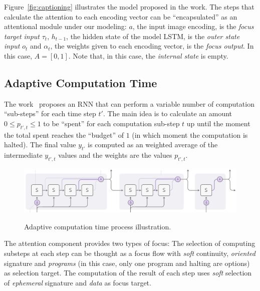 \documentclass[11pt]{article}
\begin{document}
Figure~\ref{fig:captioning} illustrates the model proposed in the work.
The steps that calculate the attention to each encoding vector can be ``encapsulated'' as
an attentional module under our modeling:
$a$, the input image encoding, is the \emph{focus target input} $\tau_t$,
$h_{t-1}$, the hidden state of the model LSTM, is the \emph{outer state input} $o_t$
and $\alpha_t$, the weights given to each encoding vector, is the \emph{focus output}. In this case, $A = [0, 1]$.
Note that, in this case, the \emph{internal state} is empty.

\subsection{Adaptive Computation Time}
The work~\cite{ref:act} proposes an RNN that can perform a variable number of computation ``sub-steps'' for each time step $t'$.
The main idea is to calculate an amount $0 \le p_{t',t} \le 1$ to be ``spent'' for each computation sub-step $t$ up until the
moment the total spent reaches the ``budget'' of $1$ (in which moment the computation is halted).
The final value $y_{t'}$ is computed as an weighted average of the intermediate $y_{t',t}$ values and the weights are the values
$p_{t',t}$.

\begin{figure}[H]
    \centering
    \includegraphics[width=0.8\linewidth]{./img/adaptive_comp.png}\label{fig:adct}
    \caption{Adaptive computation time process illustration.}
\end{figure}

The attention component provides two types of focus:
The selection of computing substeps at each step can be thought as a focus flow with \emph{soft} continuity,
\emph{oriented} signature and \emph{programs} (in this case, only one program and halting are options)
as selection target.
The computation of the result of each step uses \emph{soft} selection of \emph{ephemeral}
signature and \emph{data} as focus target.
\end{document}
